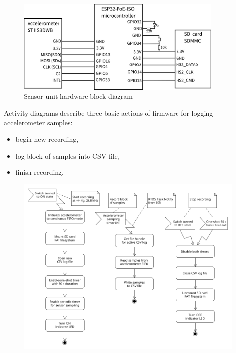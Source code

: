 \begin{figure}[h]
	\centering
	\includegraphics[width=0.9\textwidth]{assets/design/hw-block-schematic.png}
	\caption{Sensor unit hardware block diagram}
	\label{fig:design:block-diagram-hw}
\end{figure}


Activity diagrams describe three basic actions of firmware for logging accelerometer samples:

\begin{itemize}
\itemsep0pt
\item begin new recording, 
\item log block of samples into CSV file,
\item finish recording.
\end{itemize}

\begin{figure}[h]
    \centering
	\includegraphics[width=\textwidth]{assets/design/firmware-design.png}
\end{figure} 


